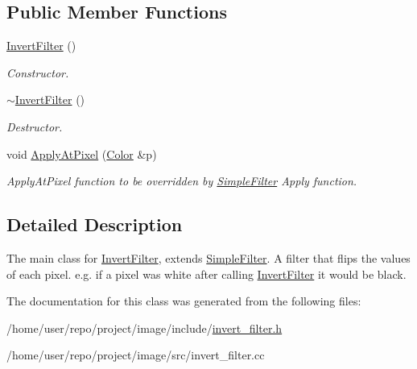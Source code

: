 \subsection*{Public Member Functions}
\begin{DoxyCompactItemize}
\item 
\mbox{\label{classInvertFilter_a30c32de66e0b4cd40174af651185d955}} 
\hyperlink{classInvertFilter_a30c32de66e0b4cd40174af651185d955}{Invert\+Filter} ()
\begin{DoxyCompactList}\small\item\em Constructor. \end{DoxyCompactList}\item 
\mbox{\label{classInvertFilter_afa6cadf8ac9634aa9ee0967121865fbc}} 
\hyperlink{classInvertFilter_afa6cadf8ac9634aa9ee0967121865fbc}{$\sim$\+Invert\+Filter} ()
\begin{DoxyCompactList}\small\item\em Destructor. \end{DoxyCompactList}\item 
\mbox{\label{classInvertFilter_a1ae9312cc5f3fd5a3019e88cccaafb3e}} 
void \hyperlink{classInvertFilter_a1ae9312cc5f3fd5a3019e88cccaafb3e}{Apply\+At\+Pixel} (\hyperlink{classColor}{Color} \&p)
\begin{DoxyCompactList}\small\item\em Apply\+At\+Pixel function to be overridden by \hyperlink{classSimpleFilter}{Simple\+Filter} Apply function. \end{DoxyCompactList}\end{DoxyCompactItemize}


\subsection{Detailed Description}
The main class for \hyperlink{classInvertFilter}{Invert\+Filter}, extends \hyperlink{classSimpleFilter}{Simple\+Filter}. A filter that flips the values of each pixel. e.\+g. if a pixel was white after calling \hyperlink{classInvertFilter}{Invert\+Filter} it would be black. 

The documentation for this class was generated from the following files\+:\begin{DoxyCompactItemize}
\item 
/home/user/repo/project/image/include/\hyperlink{invert__filter_8h}{invert\+\_\+filter.\+h}\item 
/home/user/repo/project/image/src/invert\+\_\+filter.\+cc\end{DoxyCompactItemize}
